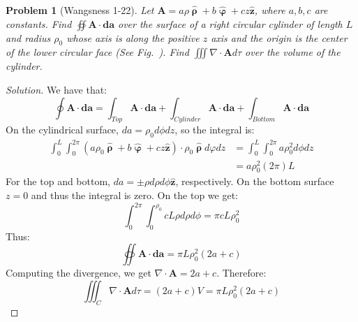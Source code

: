 \documentclass{article}
\theoremstyle{mystyle}
\newtheorem{problem}{Problem}[section]
\begin{document}
\begin{problem}[Wangsness 1-22]
Let $\mathbf{A} = a\rho\hat{\boldsymbol{\uprho}} + b\hat{\boldsymbol{\upvarphi}}+cz\hat{\mathbf{z}}$, where $a,b,c$ are constants. Find $\oiint \mathbf{A}\cdot \boldsymbol{da}$ over the surface of a right circular cylinder of length $L$ and radius $\rho_{0}$ whose axis is along the positive $z$ axis and the origin is the center of the lower circular face (See Fig.~). Find $\iiint \nabla \cdot \mathbf{A}d\tau$ over the volume of the cylinder.
\end{problem}
\begin{proof}[Solution]
We have that:
\begin{equation*}
    \oint \mathbf{A}\cdot \boldsymbol{da} = \int_{Top} \mathbf{A}\cdot \boldsymbol{da}+\int_{Cylinder} \mathbf{A}\cdot \boldsymbol{da} + \int_{Bottom} \mathbf{A}\cdot \boldsymbol{da}
\end{equation*}
On the cylindrical surface, $da = \rho_0 d\phi dz$, so the integral is:
\begin{align*}
    \int_{0}^{L}\int_{0}^{2\pi}(a\rho_0\hat{\boldsymbol{\uprho}}+b\hat{\boldsymbol{\upvarphi}}+cz\hat{\mathbf{z}})\cdot \rho_0 \hat{\boldsymbol{\uprho}}d\varphi dz &= \int_{0}^{L}\int_{0}^{2\pi}a\rho_0^2 d\phi dz\\
    &= a\rho_0^2(2\pi)L    
\end{align*}
For the top and bottom, $da = \pm \rho d\rho d\phi \hat{\mathbf{z}}$, respectively. On the bottom surface $z=0$ and thus the integral is zero. On the top we get:
\begin{equation*}
\int_{0}^{2\pi}\int_{0}^{\rho_0}cL\rho d\rho d\phi = \pi cL \rho_0^2
\end{equation*}
%
Thus:
%
\begin{equation*}
\oiint \mathbf{A}\cdot \boldsymbol{da} = \pi L \rho_0^2(2a+c)
\end{equation*}
%
Computing the divergence, we get $\nabla \cdot \mathbf{A} = 2a+c$. Therefore:
\begin{equation*}
    \iiint_C \nabla \cdot \mathbf{A} d\tau = (2a+c) V = \pi L \rho_0^2(2a+c)
\end{equation*}
\end{proof}
\end{document}
